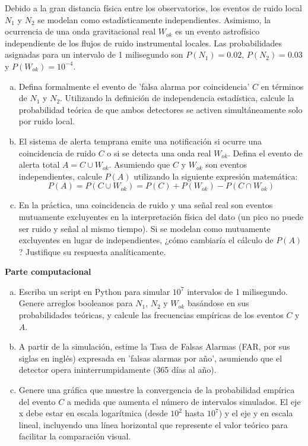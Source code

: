 \documentclass[a4paper]{article}
\begin{document}
Debido a la gran distancia física entre los observatorios, los eventos de ruido local $N_1$ y $N_2$ se modelan como estadísticamente independientes. Asimismo, la ocurrencia de una onda gravitacional real $W_{ok}$ es un evento astrofísico independiente de los flujos de ruido instrumental locales. Las probabilidades asignadas para un intervalo de 1 milisegundo son $P(N_1) = 0.02$, $P(N_2) = 0.03$ y $P(W_{ok}) = 10^{-4}$.

\begin{enumerate}[a)]
\item Defina formalmente el evento de 'falsa alarma por coincidencia' $C$ en términos de $N_1$ y $N_2$. Utilizando la definición de independencia estadística, calcule la probabilidad teórica de que ambos detectores se activen simultáneamente solo por ruido local.
\item El sistema de alerta temprana emite una notificación si ocurre una coincidencia de ruido $C$ o si se detecta una onda real $W_{ok}$. Defina el evento de alerta total $A = C \cup W_{ok}$. Asumiendo que $C$ y $W_{ok}$ son eventos independientes, calcule $P(A)$ utilizando la siguiente expresión matemática:
$$
P(A) = P(C \cup W_{ok}) = P(C) + P(W_{ok}) - P(C \cap W_{ok})
$$
\item En la práctica, una coincidencia de ruido y una señal real son eventos mutuamente excluyentes en la interpretación física del dato (un pico no puede ser ruido y señal al mismo tiempo). Si se modelan como mutuamente excluyentes en lugar de independientes, ¿cómo cambiaría el cálculo de $P(A)$? Justifique su respuesta analíticamente.
\end{enumerate}

\textbf{Parte computacional}
\begin{enumerate}[a)]
\item Escriba un script en Python para simular $10^7$ intervalos de 1 milisegundo. Genere arreglos booleanos para $N_1$, $N_2$ y $W_{ok}$ basándose en sus probabilidades teóricas, y calcule las frecuencias empíricas de los eventos $C$ y $A$.
\item A partir de la simulación, estime la Tasa de Falsas Alarmas (FAR, por sus siglas en inglés) expresada en 'falsas alarmas por año', asumiendo que el detector opera ininterrumpidamente (365 días al año).
\item Genere una gráfica  que muestre la convergencia de la probabilidad empírica del evento $C$ a medida que aumenta el número de intervalos simulados. El eje x debe estar en escala logarítmica (desde $10^2$ hasta $10^7$) y el eje y en escala lineal, incluyendo una línea horizontal que represente el valor teórico para facilitar la comparación visual.
\end{enumerate}
\end{document}
